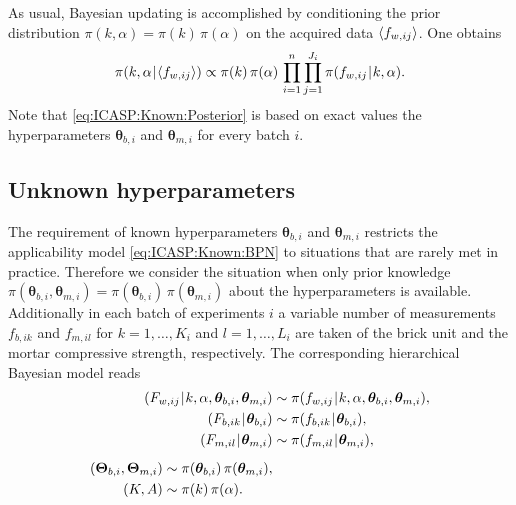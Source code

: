 \par %
As usual, Bayesian updating is accomplished by conditioning the prior distribution \(\pi(k,\alpha) = \pi(k) \, \pi(\alpha)\) on the acquired data \(\langle{f_{w,ij}}\rangle\).
One obtains
\begin{equation} \label{eq:ICASP:Known:Posterior}
  \pi(k,\alpha {\:\!}|{\:\!} \langle{f_{w,ij}}\rangle) \propto \pi(k) \, \pi(\alpha) \, \prod\limits_{i=1}^n \prod\limits_{j=1}^{J_i} \pi(f_{w,ij} {\:\!}|{\:\!} k,\alpha).
\end{equation}
Note that \cref{eq:ICASP:Known:Posterior} is based on exact values the hyperparameters \(\bm{\theta}_{b,i}\) and \(\bm{\theta}_{m,i}\) for every batch \(i\).

\subsection{Unknown hyperparameters}
The requirement of known hyperparameters \(\bm{\theta}_{b,i}\) and \(\bm{\theta}_{m,i}\) restricts the applicability model \cref{eq:ICASP:Known:BPN} to situations that are rarely met in practice.
Therefore we consider the situation when only prior knowledge \(\pi(\bm{\theta}_{b,i},\bm{\theta}_{m,i}) = \pi(\bm{\theta}_{b,i}) \, \pi(\bm{\theta}_{m,i})\) about the hyperparameters is available.
Additionally in each batch of experiments \(i\) a variable number of measurements \(f_{b,ik}\) and \(f_{m,il}\) for \(k=1,\ldots,K_i\) and \(l=1,\ldots,L_i\)
are taken of the brick unit and the mortar compressive strength, respectively.
The corresponding hierarchical Bayesian model reads
\begin{subequations} \label{eq:ICASP:Unknown:BPN}
  \begin{align}
    (F_{w,ij} \cond k,\alpha,\bm{\theta}_{b,i},\bm{\theta}_{m,i}) &\sim \pi(f_{w,ij} \cond k,\alpha,\bm{\theta}_{b,i},\bm{\theta}_{m,i}), \nonumber \\
    (F_{b,ik} \cond \bm{\theta}_{b,i}) &\sim \pi(f_{b,ik} \cond \bm{\theta}_{b,i}), \label{eq:ICASP:Unknown:BPN:Aleatory} \\
    (F_{m,il} \cond \bm{\theta}_{m,i}) &\sim \pi(f_{m,il} \cond \bm{\theta}_{m,i}), \nonumber \\[1ex]
    \begin{split}
      (\bm{\Theta}_{b,i},\bm{\Theta}_{m,i}) &\sim \pi(\bm{\theta}_{b,i}) \, \pi(\bm{\theta}_{m,i}), \\
      (K,A) &\sim \pi(k) \, \pi(\alpha). \label{eq:ICASP:Unknown:BPN:Epistemic}
    \end{split}
  \end{align}
\end{subequations}
